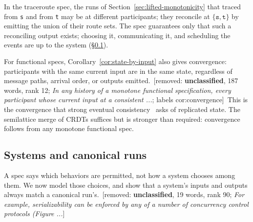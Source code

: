 \documentclass[sigconf]{cidr-2027}
\theoremstyle{remark}
\newcommand{\removednote}[1]{{\color{cutred}\footnotesize\,[removed: #1]\,}}
\begin{document}
\textcolor{newblue}{In the traceroute spec, the runs of Section~\ref{sec:lifted-monotonicity} that traced from \texttt{s} and from \texttt{t} may be at different participants; they reconcile at $\{\texttt{s},\texttt{t}\}$ by emitting the union of their route sets.} \textcolor{newblue}{The spec guarantees only that such
a reconciling output exists; choosing it, communicating it, and scheduling the events are up
to the system (\S\ref{sec:systems}).}

\textcolor{newblue}{For functional specs,
Corollary~\ref{cor:state-by-input} also gives convergence: participants with
the same current input are in the same state, regardless of message paths,
arrival order, or outputs emitted.} \removednote{\textbf{unclassified}, 187 words, rank 12; \textit{In any history of a monotone functional specification, every participant whose current input at a consistent ...}; labels cor:convergence} \textcolor{newblue}{This is the convergence that strong eventual consistency~\cite{shapiro2011crdt}
asks of replicated state.} \textcolor{newblue}{The semilattice merge of CRDTs suffices but
is stronger than required: convergence follows from any monotone functional
spec.}

\subsection{Systems and canonical runs}
\label{sec:systems}

A spec says which behaviors are permitted, not how a system chooses among them. We now model those choices, and show that a system's inputs and outputs always match a canonical run's. \removednote{\textbf{unclassified}, 19 words, rank 90; \textit{For example, serializability can be enforced by any of a number of concurrency control protocols (Figure ...}}
\end{document}
